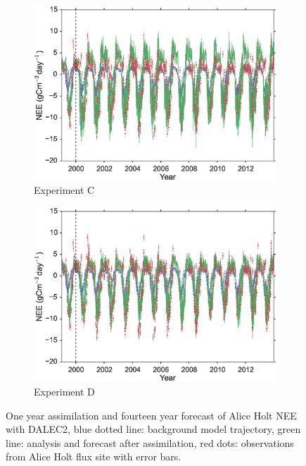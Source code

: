 \documentclass[review]{elsarticle}
\begin{document}
\begin{figure}
\begin{subfigure}[b]{0.49\textwidth}
        \includegraphics[width=\textwidth]{C4dvar.eps}
        \caption{Experiment C}
        \label{fig:4dvarBcorR}
    \end{subfigure}
    \begin{subfigure}[b]{0.49\textwidth}
        \includegraphics[width=\textwidth]{D4dvar.eps}
        \caption{Experiment D}
        \label{fig:4dvaredcBcorR}
    \end{subfigure}
    \caption{One year assimilation and fourteen year forecast of Alice Holt NEE with DALEC2, blue dotted line: background model trajectory, green line: analysis and forecast after assimilation, red dots: observations from Alice Holt flux site with error bars.}\label{fig:4dvar}
\end{figure}
\end{document}
